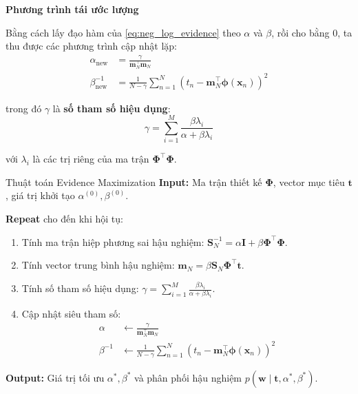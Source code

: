 \textbf{Phương trình tái ước lượng}

Bằng cách lấy đạo hàm của \eqref{eq:neg_log_evidence} theo $\alpha$ và $\beta$, rồi cho bằng 0, ta thu được các phương trình cập nhật lặp:
\begin{align}
\alpha_{\text{new}} &= \frac{\gamma}{\mathbf{m}_N^{\top}\mathbf{m}_N} \label{eq:alpha_update} \\
\beta_{\text{new}}^{-1} &= \frac{1}{N - \gamma}\sum_{n=1}^{N}\left(t_n - \mathbf{m}_N^{\top}\boldsymbol{\phi}(\mathbf{x}_n)\right)^2 \label{eq:beta_update}
\end{align}

trong đó $\gamma$ là \textbf{số tham số hiệu dụng}:
\begin{equation}
\gamma = \sum_{i=1}^{M}\frac{\beta\lambda_i}{\alpha + \beta\lambda_i}
\label{eq:gamma}
\end{equation}

với $\lambda_i$ là các trị riêng của ma trận $\mathbf{\Phi}^{\top}\mathbf{\Phi}$.

\begin{importantbox}{Thuật toán Evidence Maximization}
\textbf{Input:} Ma trận thiết kế $\mathbf{\Phi}$, vector mục tiêu $\mathbf{t}$, giá trị khởi tạo $\alpha^{(0)}, \beta^{(0)}$.

\textbf{Repeat} cho đến khi hội tụ:
\begin{enumerate}
    \item Tính ma trận hiệp phương sai hậu nghiệm: $\mathbf{S}_N^{-1} = \alpha\mathbf{I} + \beta\mathbf{\Phi}^{\top}\mathbf{\Phi}$.
    \item Tính vector trung bình hậu nghiệm: $\mathbf{m}_N = \beta\mathbf{S}_N\mathbf{\Phi}^{\top}\mathbf{t}$.
    \item Tính số tham số hiệu dụng: $\gamma = \sum_{i=1}^{M}\frac{\beta\lambda_i}{\alpha + \beta\lambda_i}$.
    \item Cập nhật siêu tham số:
    \begin{align*}
    \alpha &\leftarrow \frac{\gamma}{\mathbf{m}_N^{\top}\mathbf{m}_N} \\
    \beta^{-1} &\leftarrow \frac{1}{N - \gamma}\sum_{n=1}^{N}\left(t_n - \mathbf{m}_N^{\top}\boldsymbol{\phi}(\mathbf{x}_n)\right)^2
    \end{align*}
\end{enumerate}

\textbf{Output:} Giá trị tối ưu $\alpha^*, \beta^*$ và phân phối hậu nghiệm $p(\mathbf{w} \mid \mathbf{t}, \alpha^*, \beta^*)$.
\end{importantbox}

